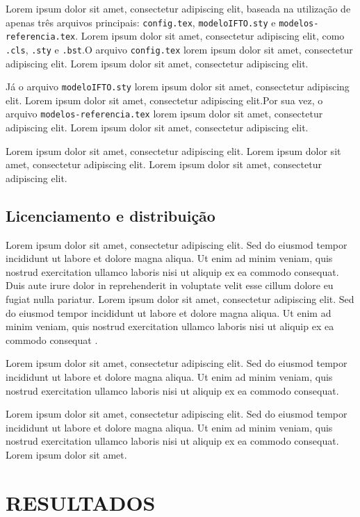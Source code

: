 \documentclass[12pt,a4paper]{article}
\begin{document}
Lorem ipsum dolor sit amet, consectetur adipiscing elit, baseada na utilização de apenas três arquivos principais: \verb|config.tex|, \verb|modeloIFTO.sty| e \verb|modelos-referencia.tex|. Lorem ipsum dolor sit amet, consectetur adipiscing elit, como \verb|.cls|, \verb|.sty| e \verb|.bst|.O arquivo \verb|config.tex| lorem ipsum dolor sit amet, consectetur adipiscing elit. Lorem ipsum dolor sit amet, consectetur adipiscing elit.

Já o arquivo \verb|modeloIFTO.sty| lorem ipsum dolor sit amet, consectetur adipiscing elit. Lorem ipsum dolor sit amet, consectetur adipiscing elit.Por sua vez, o arquivo \verb|modelos-referencia.tex| lorem ipsum dolor sit amet, consectetur adipiscing elit. Lorem ipsum dolor sit amet, consectetur adipiscing elit.

Lorem ipsum dolor sit amet, consectetur adipiscing elit. Lorem ipsum dolor sit amet, consectetur adipiscing elit. Lorem ipsum dolor sit amet, consectetur adipiscing elit.

\subsection{Licenciamento e distribuição}

\p Lorem ipsum dolor sit amet, consectetur adipiscing elit. Sed do eiusmod tempor incididunt ut labore et dolore magna aliqua. Ut enim ad minim veniam, quis nostrud exercitation ullamco laboris nisi ut aliquip ex ea commodo consequat. Duis aute irure dolor in reprehenderit in voluptate velit esse cillum dolore eu fugiat nulla pariatur.
\p Lorem ipsum dolor sit amet, consectetur adipiscing elit. Sed do eiusmod tempor incididunt ut labore et dolore magna aliqua. Ut enim ad minim veniam, quis nostrud exercitation ullamco laboris nisi ut aliquip ex ea commodo consequat \cite{lppl2008}.

Lorem ipsum dolor sit amet, consectetur adipiscing elit. Sed do eiusmod tempor incididunt ut labore et dolore magna aliqua. Ut enim ad minim veniam, quis nostrud exercitation ullamco laboris nisi ut aliquip ex ea commodo consequat.

Lorem ipsum dolor sit amet, consectetur adipiscing elit. Sed do eiusmod tempor incididunt ut labore et dolore magna aliqua. Ut enim ad minim veniam, quis nostrud exercitation ullamco laboris nisi ut aliquip ex ea commodo consequat. Lorem ipsum dolor sit amet.

\clearpage 
\section{RESULTADOS}
\label{resultados}
\end{document}
